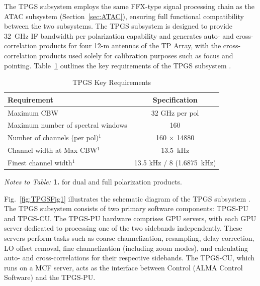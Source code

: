 
The \ac{TPGS} subsystem employs the same FFX-type signal processing chain as the \ac{ATAC} subsystem (Section~\ref{sec:ATAC}), ensuring full functional compatibility between the two subsystems.
The \ac{TPGS} subsystem is designed to provide 32~GHz \ac{IF} bandwidth per polarization capability and generates auto- and cross-correlation products for four 12-m antennas of the \ac{TP} Array, with the cross-correlation products used solely for calibration purposes such as focus and pointing. Table~\ref{tab:tpgs_req} outlines the key requirements of the \ac{TPGS} subsystem \cite{TPGS_cosdd}.

\begin{table}[h]
    \centering
    \caption{\ac{TPGS} Key Requirements \cite{TPGS_cosdd}}
    \label{tab:tpgs_req}
    \begin{tabular}{lc}
         \hline
         Requirement & Specification \\
         \hline
         Maximum \ac{CBW} & 32 GHz per pol \\
         Maximum number of spectral windows & 160 \\
         Number of channels (per pol)$^1$ & 160 $\times$ 14880 \\
         Channel width at Max \ac{CBW}$^1$ & 13.5~kHz \\
         Finest channel width$^1$ & 13.5 kHz / 8 (1.6875~kHz) \\
         \hline
    \end{tabular}
    \begin{minipage}{0.68\textwidth}
    \small
    \vspace*{0.5em}
        \textit{Notes to Table:}
        \textbf{1.} for dual and full polarization products.
    \end{minipage}
\end{table}

Fig.~\ref{fig:TPGSFig1} illustrates the schematic diagram of the TPGS subsystem \cite{TPGS_cosdd}. The \ac{TPGS} subsystem consists of two primary software components: \ac{TPGS}-\ac{PU} and \ac{TPGS}-\ac{CU}. The \ac{TPGS}-\ac{PU} hardware comprises \ac{GPU} servers, with each \ac{GPU} server dedicated to processing one of the two sidebands independently. These servers perform tasks such as coarse channelization, resampling, delay correction, \ac{LO} offset removal, fine channelization (including zoom modes), and calculating auto- and cross-correlations for their respective sidebands. The \ac{TPGS}-\ac{CU}, which runs on a \ac{MCF} server, acts as the interface between Control (ALMA Control Software) and the \ac{TPGS}-\ac{PU}.

